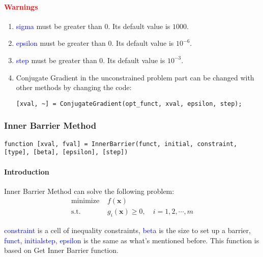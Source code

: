 \documentclass{article}
\begin{document}
\paragraph{\textcolor{red}{Warnings}}
\begin{enumerate}
    \item \textcolor{blue}{sigma} must be greater than $0$. Its default value is $1000$.
    \item \textcolor{blue}{epsilon} must be greater than $0$. Its default value is $10^{-6}$.
    \item \textcolor{blue}{step} must be greater than $0$. Its default value is $10^{-3}$.
    \item Conjugate Gradient in the unconstrained problem part can be changed with other methods by changing the code:
    \begin{verbatim}
[xval, ~] = ConjugateGradient(opt_funct, xval, epsilon, step);   
    \end{verbatim}
\end{enumerate}

\subsubsection{Inner Barrier Method}
\begin{verbatim}
function [xval, fval] = InnerBarrier(funct, initial, constraint, [type], [beta], [epsilon], [step])
\end{verbatim}
\paragraph{Introduction}
Inner Barrier Method can solve the following problem:
\begin{align*}
    \mbox{minimize } & f(\mathbf{x}) \\
    \mbox{s.t. } & g_i(\mathbf{x}) \geqslant 0, \quad i = 1, 2, \cdots, m
\end{align*}

\textcolor{blue}{constraint} is a cell of inequality constraints, \textcolor{blue}{beta} is the size to set up a barrier, \textcolor{blue}{funct, initialstep, epsilon} is the same as what's mentioned before. This function is based on Get Inner Barrier function.
\end{document}
